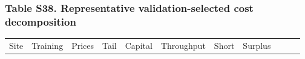 \documentclass[a4paper,11pt]{article}
\newcounter{none}
\begin{document}
\subsubsection{Table S38. Representative validation-selected cost decomposition}\label{table-s38.-representative-validation-selected-cost-decomposition}

{\def\LTcaptype{none} %
\begin{longtable}[]{@{}
  >{\raggedright\arraybackslash}p{}
  >{\raggedright\arraybackslash}p{}
  >{\raggedright\arraybackslash}p{}
  >{\raggedright\arraybackslash}p{}
  >{\raggedright\arraybackslash}p{}
  >{\raggedright\arraybackslash}p{}
  >{\raggedright\arraybackslash}p{}
  >{\raggedright\arraybackslash}p{}
  >{\raggedright\arraybackslash}p{}
  >{\raggedright\arraybackslash}p{}
  >{\raggedright\arraybackslash}p{}@{}}
\toprule\noalign{}
\begin{minipage}[b]{\linewidth}\raggedright
Site
\end{minipage} & \begin{minipage}[b]{\linewidth}\raggedright
Training
\end{minipage} & \begin{minipage}[b]{\linewidth}\raggedright
Prices
\end{minipage} & \begin{minipage}[b]{\linewidth}\raggedright
Tail
\end{minipage} & \begin{minipage}[b]{\linewidth}\raggedright
Capital
\end{minipage} & \begin{minipage}[b]{\linewidth}\raggedright
Throughput
\end{minipage} & \begin{minipage}[b]{\linewidth}\raggedright
Short
\end{minipage} & \begin{minipage}[b]{\linewidth}\raggedright
Surplus
\end{minipage} & \begin{minipage}[b]{\linewidth}\raggedright

\end{minipage}
\end{longtable}}
\end{document}
